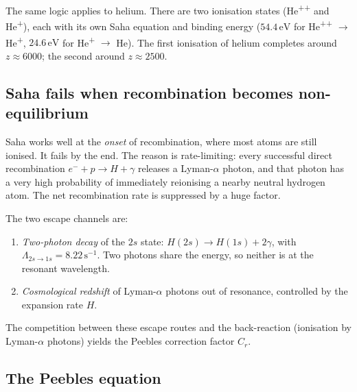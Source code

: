 The same logic applies to helium. There are two ionisation states (He\textsuperscript{++} and He\textsuperscript{+}), each with its own Saha equation and binding energy ($54.4\,\mathrm{eV}$ for He\textsuperscript{++} $\to$ He\textsuperscript{+}, $24.6\,\mathrm{eV}$ for He\textsuperscript{+} $\to$ He). The first ionisation of helium completes around $z \approx 6000$; the second around $z \approx 2500$.

\subsection{Saha fails when recombination becomes non-equilibrium}

Saha works well at the \emph{onset} of recombination, where most atoms are still ionised. It fails by the end. The reason is rate-limiting: every successful direct recombination $e^- + p \to H + \gamma$ releases a Lyman-$\alpha$ photon, and that photon has a very high probability of immediately reionising a nearby neutral hydrogen atom. The net recombination rate is suppressed by a huge factor.

The two escape channels are:
\begin{enumerate}
  \item \emph{Two-photon decay} of the $2s$ state: $H(2s) \to H(1s) + 2\gamma$, with $\Lambda_{2s\to 1s} = 8.22\,\mathrm{s}^{-1}$. Two photons share the energy, so neither is at the resonant wavelength.
  \item \emph{Cosmological redshift} of Lyman-$\alpha$ photons out of resonance, controlled by the expansion rate $H$.
\end{enumerate}
The competition between these escape routes and the back-reaction (ionisation by Lyman-$\alpha$ photons) yields the Peebles correction factor $C_r$.

\subsection{The Peebles equation}

